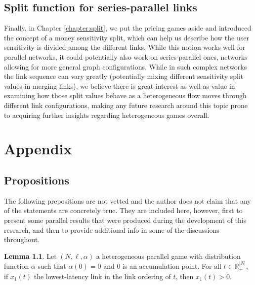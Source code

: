 \documentclass[10pt,a4paper]{book}
\newcommand{\R}{\mathbb{R}}
\theoremstyle{definition}
\newtheorem{lemma}[definition]{Lemma}
\theoremstyle{comment}
\begin{document}
\section*{Split function for series-parallel links}

Finally, in Chapter \ref{chapter:split}, we put the pricing games aside and introduced the concept of a money sensitivity split, which can help us describe how the user sensitivity is divided among the different links.
While this notion works well for parallel networks, it could potentially also work on series-parallel ones, networks allowing for more general graph configurations.
While in such complex networks the link sequence can vary greatly (potentially mixing different sensitivity split values in merging links), we believe there is great interest as well as value in examining how those split values behave as a heterogeneous flow moves through different link configurations, making any future research around this topic prone to acquiring further insights regarding heterogeneous games overall.

\cleardoublepage

{}


\cleardoublepage

{}
\chapter{Appendix}
\label{chapter:appendix}

\section*{Propositions}

The following prepositions are not vetted and the author does not claim that any of the statements are concretely true.
They are included here, however, first to present some parallel results that were produced during the development of this research, and then to provide additional info in some of the discussions throughout.

\begin{lemma}
	\label{lemma:a_0_accumulation_point}
	Let $(N, \ell, \alpha)$ a heterogeneous parallel game with distribution function $\alpha$ such that $\alpha(0) = 0$ and $0$ is an accumulation point.
	For all $t \in \R_+^{|N|}$, if $x_1(t)$ the lowest-latency link in the link ordering of $t$, then $x_1(t) > 0$.
\end{lemma}
\end{document}
